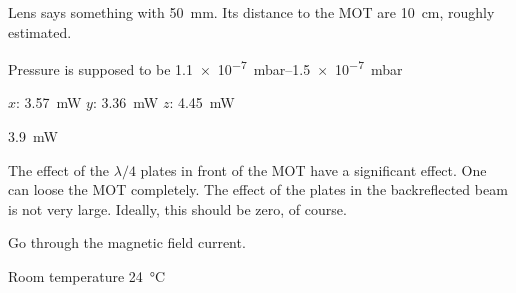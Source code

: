 \documentclass[11pt, english, fleqn, DIV=15, headinclude, BCOR=2cm]{scrreprt}
\begin{document}
Lens says something with \SI{50}{\milli\meter}. Its distance to the MOT are
\SI{10}{\centi\meter}, roughly estimated.

Pressure is supposed to be \SIrange{1.1e-7}{1.5e-7}{\milli\bar}

$x$: \SI{3.57}{\milli\watt}
$y$: \SI{3.36}{\milli\watt}
$z$: \SI{4.45}{\milli\watt}

\SI{3.9}{\milli\watt}

The effect of the $\lambda/4$ plates in front of the MOT have a significant
effect. One can loose the MOT completely. The effect of the plates in the
backreflected beam is not very large. Ideally, this should be zero, of
course.

Go through the magnetic field current.


Room temperature \SI{24}{\celsius}
\end{document}
